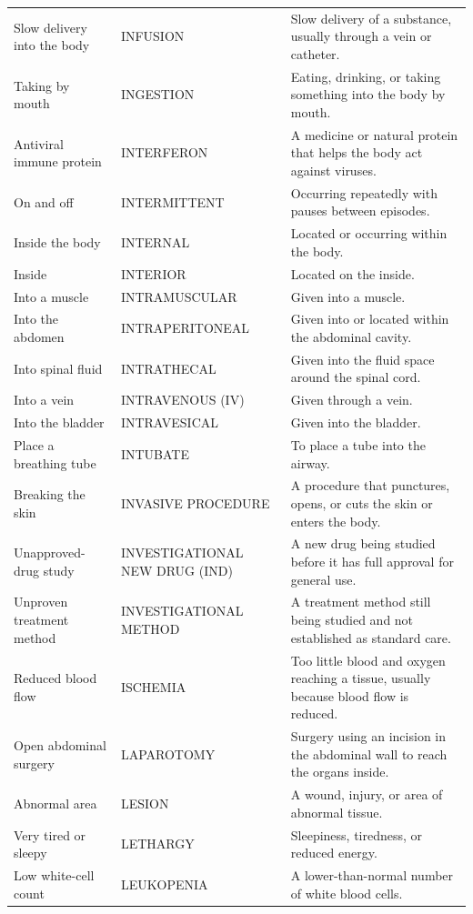 \begin{longtable}{>{\raggedright\arraybackslash}p{} >{\raggedright\arraybackslash}p{} >{\raggedright\arraybackslash}p{}}
Slow delivery into the body & INFUSION & Slow delivery of a substance, usually through a vein or catheter. \\
Taking by mouth & INGESTION & Eating, drinking, or taking something into the body by mouth. \\
Antiviral immune protein & INTERFERON & A medicine or natural protein that helps the body act against viruses. \\
On and off & INTERMITTENT & Occurring repeatedly with pauses between episodes. \\
Inside the body & INTERNAL & Located or occurring within the body. \\
Inside & INTERIOR & Located on the inside. \\
Into a muscle & INTRAMUSCULAR & Given into a muscle. \\
Into the abdomen & INTRAPERITONEAL & Given into or located within the abdominal cavity. \\
Into spinal fluid & INTRATHECAL & Given into the fluid space around the spinal cord. \\
Into a vein & INTRAVENOUS (IV) & Given through a vein. \\
Into the bladder & INTRAVESICAL & Given into the bladder. \\
Place a breathing tube & INTUBATE & To place a tube into the airway. \\
Breaking the skin & INVASIVE PROCEDURE & A procedure that punctures, opens, or cuts the skin or enters the body. \\
Unapproved-drug study & INVESTIGATIONAL NEW DRUG (IND) & A new drug being studied before it has full approval for general use. \\
Unproven treatment method & INVESTIGATIONAL METHOD & A treatment method still being studied and not established as standard care. \\
Reduced blood flow & ISCHEMIA & Too little blood and oxygen reaching a tissue, usually because blood flow is reduced. \\
Open abdominal surgery & LAPAROTOMY & Surgery using an incision in the abdominal wall to reach the organs inside. \\
Abnormal area & LESION & A wound, injury, or area of abnormal tissue. \\
Very tired or sleepy & LETHARGY & Sleepiness, tiredness, or reduced energy. \\
Low white-cell count & LEUKOPENIA & A lower-than-normal number of white blood cells. \\

\end{longtable}
